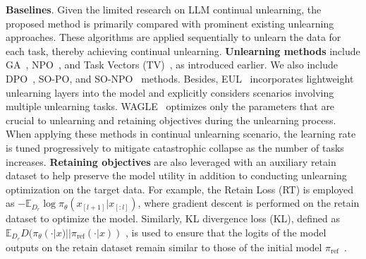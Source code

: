 \documentclass{article}
\theoremstyle{plain}
\theoremstyle{definition}
\theoremstyle{remark}
\begin{document}
\textbf{Baselines}.
Given the limited research on LLM continual unlearning, the proposed method is primarily compared with prominent existing unlearning approaches. These algorithms are applied sequentially to unlearn the data for each task, thereby achieving continual unlearning. \textbf{Unlearning methods} include GA~\cite{DBLP:journals/corr/abs-2310-10683}, NPO~\cite{DBLP:journals/corr/abs-2404-05868}, and Task Vectors (TV)~\cite{DBLP:conf/iclr/IlharcoRWSHF23}, as introduced earlier. 
We also include DPO~\cite{DBLP:journals/corr/abs-2404-05868}, SO-PO, and SO-NPO~\cite{DBLP:conf/emnlp/JiaZZLRDK024} methods.
Besides, EUL~\cite{DBLP:conf/emnlp/ChenY23} incorporates lightweight unlearning layers into the model and explicitly considers scenarios involving multiple unlearning tasks.
WAGLE~\cite{DBLP:journals/corr/abs-2410-17509} optimizes only the parameters that are crucial to unlearning and retaining objectives during the unlearning process.
When applying these methods in continual unlearning scenario, the learning rate is tuned progressively to mitigate catastrophic collapse as the number of tasks increases.
\textbf{Retaining objectives} are also leveraged with an auxiliary retain dataset to help preserve the model utility in addition to conducting unlearning optimization on the target data.
For example, the Retain Loss (RT) is employed as $-\mathbb{E}_{D_r}\log{\pi_{\theta}(x_{[l+1]}|x_{[:l]})}$, where gradient descent is performed on the retain dataset to optimize the model.
Similarly, KL divergence loss (KL), defined as $\mathbb{E}_{D_r}D(\pi_\theta(\cdot|x)||\pi_{\text{ref}}(\cdot|x))$ , is used to ensure that the logits of the model outputs on the retain dataset remain similar to those of the initial model $\pi_{\text{ref}}$~\cite{DBLP:journals/corr/abs-2404-05868}.
\end{document}
